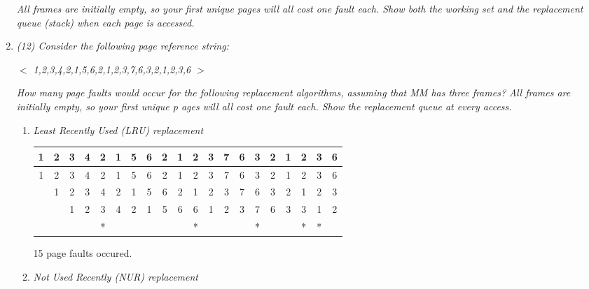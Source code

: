 \documentclass[letterpaper,11pt]{article}
\begin{document}
\begin{enumerate}
\emph{All frames are initially empty, so your ﬁrst unique pages will all cost one fault each. Show
both the working set and the replacement queue (stack) when each page is accessed.}

\item  \emph{(12) Consider the following page reference string:}

\emph{$<$ 1,2,3,4,2,1,5,6,2,1,2,3,7,6,3,2,1,2,3,6 $>$}

\emph{How many page faults would occur for the following replacement algorithms, assuming that MM has three frames? All frames are initially empty, so your ﬁrst unique p ages will all cost one fault each. Show the replacement queue at every access.}

  \begin{enumerate}
    \item \emph{Least Recently Used (LRU) replacement}

\begin{center}
  \begin{tabular}{ | c | c | c | c | c | c | c | c | c | c | c | c | c | c | c | c | c | c | c | c | }
  \hline
                     1 & 2 & 3 & 4 & 2 & 1 & 5 & 6 & 2 & 1 & 2 & 3 & 7 & 6 & 3 & 2 & 1 & 2 & 3 & 6 \\ \hline 
                     1 & 2 & 3 & 4 & 2 & 1 & 5 & 6 & 2 & 1 & 2 & 3 & 7 & 6 & 3 & 2 & 1 & 2 & 3 & 6 \\
                       & 1 & 2 & 3 & 4 & 2 & 1 & 5 & 6 & 2 & 1 & 2 & 3 & 7 & 6 & 3 & 2 & 1 & 2 & 3 \\ 
                       &   & 1 & 2 & 3 & 4 & 2 & 1 & 5 & 6 & 6 & 1 & 2 & 3 & 7 & 6 & 3 & 3 & 1 & 2 \\ \hline
                       &   &   &   & * &   &   &   &   &   & * &   &   &   & * &   &   & * & * &   \\ \hline
  \end{tabular}
\end{center}

15 page faults occured.
    \item \emph{Not Used Recently (NUR) replacement}


\end{enumerate}
\end{enumerate}
\end{document}
